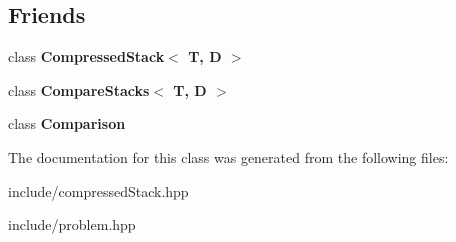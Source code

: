 \subsection*{Friends}
\begin{DoxyCompactItemize}
\item 
class {\bfseries Compressed\+Stack$<$ T, D $>$}\hypertarget{class_problem_a0bc563c952d4b72ba232305ab7717bd9}{}\label{class_problem_a0bc563c952d4b72ba232305ab7717bd9}

\item 
class {\bfseries Compare\+Stacks$<$ T, D $>$}\hypertarget{class_problem_aad0b6ceccdc6599793a7e2e5798b59ad}{}\label{class_problem_aad0b6ceccdc6599793a7e2e5798b59ad}

\item 
class {\bfseries Comparison}\hypertarget{class_problem_aef3aa9a02bb7e4bcae2ebd8975a9206d}{}\label{class_problem_aef3aa9a02bb7e4bcae2ebd8975a9206d}

\end{DoxyCompactItemize}


The documentation for this class was generated from the following files\+:\begin{DoxyCompactItemize}
\item 
include/compressed\+Stack.\+hpp\item 
include/problem.\+hpp\end{DoxyCompactItemize}
